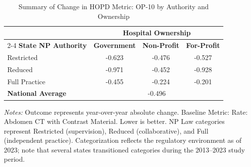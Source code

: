 \begin{table}[htbp]
    \centering
    \caption{Summary of Change in HOPD Metric: OP-10 by Authority and Ownership}
    \label{tab:d_hopd_op_10}
    \vspace{0.2cm}
    \begin{tabular}{lccc}
        \toprule
        & \multicolumn{3}{c}{\textbf{Hospital Ownership}} \\
        \cmidrule(lr){2-4}
        \textbf{State NP Authority} & \textbf{Government} & \textbf{Non-Profit} & \textbf{For-Profit} \\
        \midrule
        Restricted & -0.623 & -0.476 & -0.527 \\
        Reduced & -0.971 & -0.452 & -0.928 \\
        Full Practice & -0.455 & -0.224 & -0.201 \\
        \midrule
        \textbf{National Average} & \multicolumn{3}{c}{-0.496} \\
        \bottomrule
    \end{tabular}
    \vspace{0.1cm}
    \begin{minipage}{0.85\textwidth}
        \footnotesize \textit{Notes:} Outcome represents year-over-year absolute change. Baseline Metric: Rate: Abdomen CT with Contrast Material. Lower is better. NP Law categories represent Restricted (supervision), Reduced (collaborative), and Full (independent practice). Categorization reflects the regulatory environment as of 2023; note that several states transitioned categories during the 2013--2023 study period.
    \end{minipage}
\end{table}